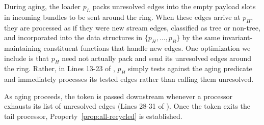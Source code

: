 During aging, the loader $p_L$ packs unresolved edges into the empty payload
slots in incoming bundles to be sent around the ring.  When these edges
arrive at $p_H$, they are processed as if they were new stream edges,
classified as tree or non-tree, and incorporated into the data structures
in $\{p_H,\ldots,p_B\}$ by the same invariant-maintaining constituent 
functions that handle new edges.  One optimization we include is that
$p_H$ need not actually pack and send its unresolved edges around the
ring.  Rather, in Lines 13-23 of , $p_H$ simply tests
against the aging predicate and immediately processes its tested edges
rather than calling them unresolved.  

As aging proceeds, the  token is passed downstream whenever
a processor exhausts its list of unresolved edges (Lines 28-31 of 
). Once the  token exits the tail
processor, Property~\ref{prop:all-recycled} is established.


